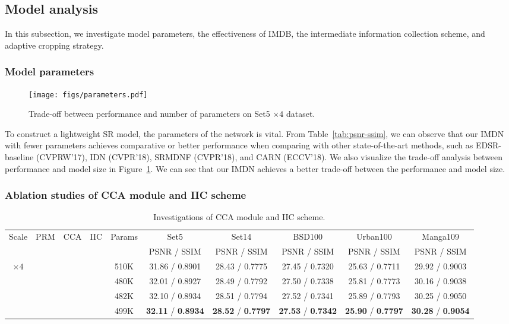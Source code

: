 \documentclass[sigconf]{acmart}
\begin{document}
\subsection{Model analysis}
In this subsection, we investigate model parameters, the effectiveness of IMDB, the intermediate information collection scheme, and adaptive cropping strategy.
\subsubsection{Model parameters}
\begin{figure}[htpb]
	\centering
	\texttt{[image: figs/parameters.pdf]}
	\vspace{-3mm}
	\caption{Trade-off between performance and number of parameters on Set5 $\times 4$ dataset.}
	\label{fig:parameters}
\end{figure}
To construct a lightweight SR model, the parameters of the network is vital. From Table~\ref{tab:psnr-ssim}, we can observe that our IMDN with fewer parameters achieves comparative or better performance when comparing with other state-of-the-art methods, such as EDSR-baseline (CVPRW'17), IDN (CVPR'18), SRMDNF (CVPR'18), and CARN (ECCV'18). We also visualize the trade-off analysis between performance and model size in Figure~\ref{fig:parameters}. We can see that our IMDN achieves a better trade-off between the performance and model size.

\subsubsection{Ablation studies of CCA module and IIC scheme}
\begin{table*}[htpb]
	\centering
	\caption{Investigations of CCA module and IIC scheme.}
	\label{tab:cca-iic}
	\begin{tabular}{|c|c|c|c|c|c|c|c|c|c|}
		\hline
		\multirow{2}{*}{Scale} & \multirow{2}{*}{PRM} & \multirow{2}{*}{CCA} & \multirow{2}{*}{IIC} & \multirow{2}{*}{Params} & Set5 & Set14 & BSD100 & Urban100 & Manga109 \\
		\cline{6-10}
		& & & & & PSNR / SSIM & PSNR / SSIM & PSNR / SSIM & PSNR / SSIM & PSNR / SSIM \\
		\hline
		\hline
		\multirow{4}{*}{$\times 4$} & \XSolid & \XSolid & \XSolid & 510K & 31.86 / 0.8901 & 28.43 / 0.7775 &  27.45 / 0.7320 & 25.63 / 0.7711 & 29.92 / 0.9003 \\
		
		& \Checkmark & \XSolid & \XSolid & 480K & 32.01 / 0.8927 & 28.49 / 0.7792 & 27.50 / 0.7338 & 25.81 / 0.7773 & 30.16 / 0.9038 \\
		& \Checkmark& \Checkmark & \XSolid & 482K & 32.10 / 0.8934 & 28.51 / 0.7794 & 27.52 / 0.7341 & 25.89 / 0.7793 & 30.25 / 0.9050 \\
		& \Checkmark & \Checkmark & \Checkmark & 499K & \textbf{32.11} / \textbf{0.8934} & \textbf{28.52} / \textbf{0.7797} & \textbf{27.53} / \textbf{0.7342} & \textbf{25.90} / \textbf{0.7797} & \textbf{30.28} / \textbf{0.9054} \\
		\hline
	\end{tabular}
\end{table*}
\end{document}
